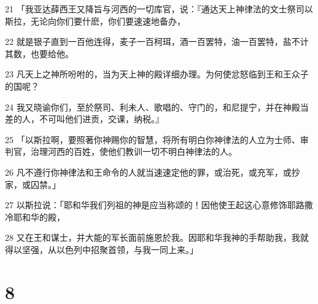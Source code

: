 \par 21 「我亚达薛西王又降旨与河西的一切库官，说：『通达天上神律法的文士祭司以斯拉，无论向你们要什麽，你们要速速地备办，
\par 22 就是银子直到一百他连得，麦子一百柯珥，酒一百罢特，油一百罢特，盐不计其数，也要给他。
\par 23 凡天上之神所吩咐的，当为天上神的殿详细办理。为何使忿怒临到王和王众子的国呢？
\par 24 我又晓谕你们，至於祭司、利未人、歌唱的、守门的，和尼提宁，并在神殿当差的人，不可叫他们进贡，交课，纳税。』
\par 25 「以斯拉啊，要照著你神赐你的智慧，将所有明白你神律法的人立为士师、审判官，治理河西的百姓，使他们教训一切不明白神律法的人。
\par 26 凡不遵行你神律法和王命令的人就当速速定他的罪，或治死，或充军，或抄家，或囚禁。」
\par 27 以斯拉说：「耶和华我们列祖的神是应当称颂的！因他使王起这心意修饰耶路撒冷耶和华的殿，
\par 28 又在王和谋士，并大能的军长面前施恩於我。因耶和华我神的手帮助我，我就得以坚强，从以色列中招聚首领，与我一同上来。」

\chapter{8}

